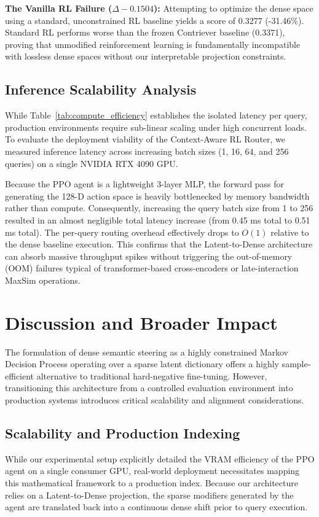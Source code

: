 \textbf{The Vanilla RL Failure ($\Delta -0.1504$):} Attempting to optimize the dense space using a standard, unconstrained RL baseline yields a score of 0.3277 (-31.46\%). Standard RL performs worse than the frozen Contriever baseline (0.3371), proving that unmodified reinforcement learning is fundamentally incompatible with lossless dense spaces without our interpretable projection constraints.

\subsection{Inference Scalability Analysis}
While Table~\ref{tab:compute_efficiency} establishes the isolated latency per query, production environments require sub-linear scaling under high concurrent loads. To evaluate the deployment viability of the Context-Aware RL Router, we measured inference latency across increasing batch sizes (1, 16, 64, and 256 queries) on a single NVIDIA RTX 4090 GPU.

Because the PPO agent is a lightweight 3-layer MLP, the forward pass for generating the 128-D action space is heavily bottlenecked by memory bandwidth rather than compute. Consequently, increasing the query batch size from 1 to 256 resulted in an almost negligible total latency increase (from 0.45 ms total to 0.51 ms total). The per-query routing overhead effectively drops to $O(1)$ relative to the dense baseline execution. This confirms that the Latent-to-Dense architecture can absorb massive throughput spikes without triggering the out-of-memory (OOM) failures typical of transformer-based cross-encoders or late-interaction MaxSim operations.

\section{Discussion and Broader Impact}
The formulation of dense semantic steering as a highly constrained Markov Decision Process operating over a sparse latent dictionary offers a highly sample-efficient alternative to traditional hard-negative fine-tuning. However, transitioning this architecture from a controlled evaluation environment into production systems introduces critical scalability and alignment considerations.

\subsection{Scalability and Production Indexing}
While our experimental setup explicitly detailed the VRAM efficiency of the PPO agent on a single consumer GPU, real-world deployment necessitates mapping this mathematical framework to a production index. Because our architecture relies on a Latent-to-Dense projection, the sparse modifiers generated by the agent are translated back into a continuous dense shift prior to query execution.

